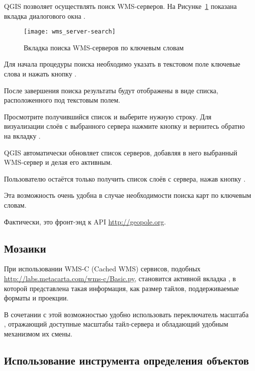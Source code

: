 QGIS позволяет осуществлять поиск WMS-серверов. На Рисунке~\ref{fig:searchtab}
показана вкладка  диалогового окна
.

\begin{figure}[ht]
  \centering
  \texttt{[image: wms\_server-search]}
    \caption{Вкладка поиска WMS-серверов по ключевым словам
    \wincaption}\label{fig:searchtab}
\end{figure}

Для начала процедуры поиска необходимо указать в текстовом поле ключевые
слова и нажать кнопку .

После завершения поиска результаты будут отображены в виде списка,
расположенного под текстовым полем.

Просмотрите получившийся список и выберите нужную строку. Для визуализации
слоёв с выбранного сервера нажмите кнопку  и вернитесь обратно на вкладку .

QGIS автоматически обновляет список серверов, добавляя в него выбранный
WMS-сервер и делая его активным.

Пользователю остаётся только получить список слоёв с сервера, нажав кнопку
.

Эта возможность очень удобна в случае необходимости поиска карт по
ключевым словам.

Фактически, это фронт-энд к API \url{http://geopole.org}.

%
%
\subsection{Мозаики}\label{sec:tilesets}

При использовании WMS-C (Cached WMS) сервисов, подобных
\url{http://labs.metacarta.com/wms-c/Basic.py}, становится активной вкладка
, в которой представлена такая информация, как размер
тайлов, поддерживаемые форматы и проекции.

В сочетании с этой возможностью удобно использовать переключатель масштаба
 \arrow \\
, отражающий доступные масштабы
тайл-сервера и обладающий удобным механизмом их смены.
%
%
\subsection{Использование инструмента определения
объектов}\label{sec:ogc-wms-identify}

